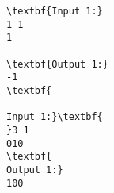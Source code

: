 \begin{verbatim}
\textbf{Input 1:}
1 1
1

\textbf{Output 1:}
-1
\textbf{

Input 1:}\textbf{
}3 1
010
\textbf{
Output 1:}
100
\end{verbatim}